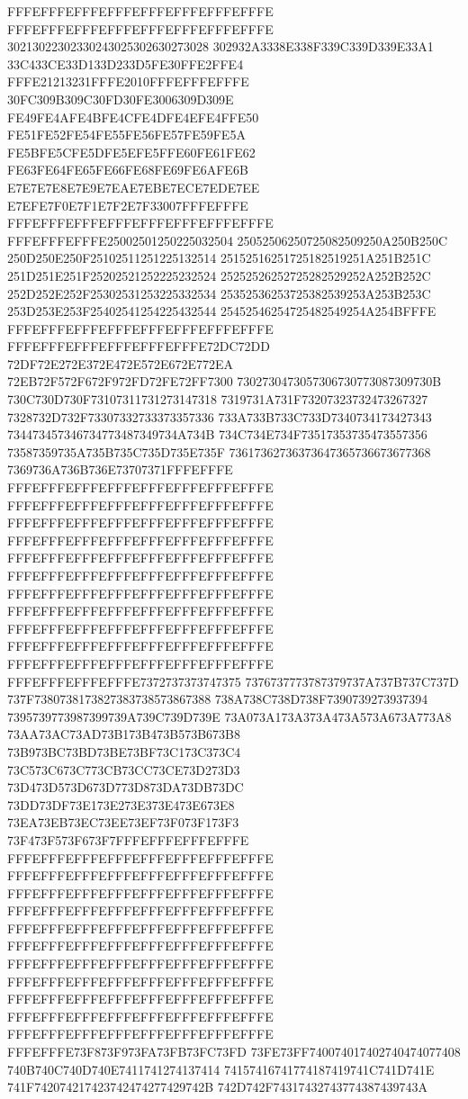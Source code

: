FFFEFFFEFFFEFFFEFFFEFFFEFFFEFFFE
FFFEFFFEFFFEFFFEFFFEFFFEFFFEFFFE
30213022302330243025302630273028
302932A3338E338F339C339D339E33A1
33C433CE33D133D233D5FE30FFE2FFE4
FFFE21213231FFFE2010FFFEFFFEFFFE
30FC309B309C30FD30FE3006309D309E
FE49FE4AFE4BFE4CFE4DFE4EFE4FFE50
FE51FE52FE54FE55FE56FE57FE59FE5A
FE5BFE5CFE5DFE5EFE5FFE60FE61FE62
FE63FE64FE65FE66FE68FE69FE6AFE6B
E7E7E7E8E7E9E7EAE7EBE7ECE7EDE7EE
E7EFE7F0E7F1E7F2E7F33007FFFEFFFE
FFFEFFFEFFFEFFFEFFFEFFFEFFFEFFFE
FFFEFFFEFFFE25002501250225032504
25052506250725082509250A250B250C
250D250E250F25102511251225132514
25152516251725182519251A251B251C
251D251E251F25202521252225232524
25252526252725282529252A252B252C
252D252E252F25302531253225332534
25352536253725382539253A253B253C
253D253E253F25402541254225432544
25452546254725482549254A254BFFFE
FFFEFFFEFFFEFFFEFFFEFFFEFFFEFFFE
FFFEFFFEFFFEFFFEFFFEFFFE72DC72DD
72DF72E272E372E472E572E672E772EA
72EB72F572F672F972FD72FE72FF7300
7302730473057306730773087309730B
730C730D730F73107311731273147318
7319731A731F73207323732473267327
7328732D732F73307332733373357336
733A733B733C733D7340734173427343
734473457346734773487349734A734B
734C734E734F73517353735473557356
73587359735A735B735C735D735E735F
73617362736373647365736673677368
7369736A736B736E73707371FFFEFFFE
FFFEFFFEFFFEFFFEFFFEFFFEFFFEFFFE
FFFEFFFEFFFEFFFEFFFEFFFEFFFEFFFE
FFFEFFFEFFFEFFFEFFFEFFFEFFFEFFFE
FFFEFFFEFFFEFFFEFFFEFFFEFFFEFFFE
FFFEFFFEFFFEFFFEFFFEFFFEFFFEFFFE
FFFEFFFEFFFEFFFEFFFEFFFEFFFEFFFE
FFFEFFFEFFFEFFFEFFFEFFFEFFFEFFFE
FFFEFFFEFFFEFFFEFFFEFFFEFFFEFFFE
FFFEFFFEFFFEFFFEFFFEFFFEFFFEFFFE
FFFEFFFEFFFEFFFEFFFEFFFEFFFEFFFE
FFFEFFFEFFFEFFFEFFFEFFFEFFFEFFFE
FFFEFFFEFFFEFFFE7372737373747375
7376737773787379737A737B737C737D
737F7380738173827383738573867388
738A738C738D738F7390739273937394
7395739773987399739A739C739D739E
73A073A173A373A473A573A673A773A8
73AA73AC73AD73B173B473B573B673B8
73B973BC73BD73BE73BF73C173C373C4
73C573C673C773CB73CC73CE73D273D3
73D473D573D673D773D873DA73DB73DC
73DD73DF73E173E273E373E473E673E8
73EA73EB73EC73EE73EF73F073F173F3
73F473F573F673F7FFFEFFFEFFFEFFFE
FFFEFFFEFFFEFFFEFFFEFFFEFFFEFFFE
FFFEFFFEFFFEFFFEFFFEFFFEFFFEFFFE
FFFEFFFEFFFEFFFEFFFEFFFEFFFEFFFE
FFFEFFFEFFFEFFFEFFFEFFFEFFFEFFFE
FFFEFFFEFFFEFFFEFFFEFFFEFFFEFFFE
FFFEFFFEFFFEFFFEFFFEFFFEFFFEFFFE
FFFEFFFEFFFEFFFEFFFEFFFEFFFEFFFE
FFFEFFFEFFFEFFFEFFFEFFFEFFFEFFFE
FFFEFFFEFFFEFFFEFFFEFFFEFFFEFFFE
FFFEFFFEFFFEFFFEFFFEFFFEFFFEFFFE
FFFEFFFEFFFEFFFEFFFEFFFEFFFEFFFE
FFFEFFFE73F873F973FA73FB73FC73FD
73FE73FF740074017402740474077408
740B740C740D740E7411741274137414
74157416741774187419741C741D741E
741F742074217423742474277429742B
742D742F74317432743774387439743A
